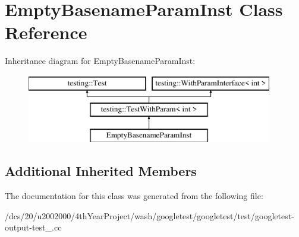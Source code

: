 \hypertarget{classEmptyBasenameParamInst}{}\section{Empty\+Basename\+Param\+Inst Class Reference}
\label{classEmptyBasenameParamInst}
Inheritance diagram for Empty\+Basename\+Param\+Inst\+:\begin{figure}[H]
\begin{center}
\leavevmode
\includegraphics[height=3.000000cm]{classEmptyBasenameParamInst}
\end{center}
\end{figure}
\subsection*{Additional Inherited Members}


The documentation for this class was generated from the following file\+:\begin{DoxyCompactItemize}
\item 
/dcs/20/u2002000/4th\+Year\+Project/wash/googletest/googletest/test/googletest-\/output-\/test\+\_\+.\+cc\end{DoxyCompactItemize}
